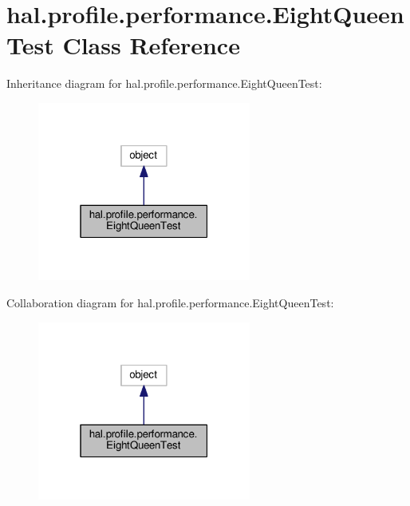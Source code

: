 \hypertarget{classhal_1_1profile_1_1performance_1_1_eight_queen_test}{}\section{hal.\+profile.\+performance.\+Eight\+Queen\+Test Class Reference}
\label{classhal_1_1profile_1_1performance_1_1_eight_queen_test}


Inheritance diagram for hal.\+profile.\+performance.\+Eight\+Queen\+Test\+:\nopagebreak
\begin{figure}[H]
\begin{center}
\leavevmode
\includegraphics[width=199pt]{classhal_1_1profile_1_1performance_1_1_eight_queen_test__inherit__graph}
\end{center}
\end{figure}


Collaboration diagram for hal.\+profile.\+performance.\+Eight\+Queen\+Test\+:\nopagebreak
\begin{figure}[H]
\begin{center}
\leavevmode
\includegraphics[width=199pt]{classhal_1_1profile_1_1performance_1_1_eight_queen_test__coll__graph}
\end{center}
\end{figure}
